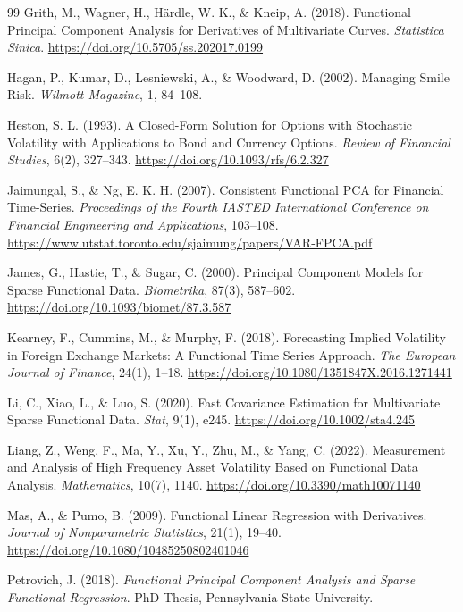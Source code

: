 \documentclass[a4paper,11pt]{article}
\begin{document}
\begin{thebibliography}{99}
Grith, M., Wagner, H., Härdle, W. K., \& Kneip, A. (2018). Functional Principal Component Analysis for Derivatives of Multivariate Curves. \emph{Statistica Sinica}. \url{https://doi.org/10.5705/ss.202017.0199}

Hagan, P., Kumar, D., Lesniewski, A., \& Woodward, D. (2002). Managing Smile Risk. \emph{Wilmott Magazine}, 1, 84--108.

Heston, S. L. (1993). A Closed-Form Solution for Options with Stochastic Volatility with Applications to Bond and Currency Options. \emph{Review of Financial Studies}, 6(2), 327--343. \url{https://doi.org/10.1093/rfs/6.2.327}

Jaimungal, S., \& Ng, E. K. H. (2007). Consistent Functional PCA for Financial Time-Series. \emph{Proceedings of the Fourth IASTED International Conference on Financial Engineering and Applications}, 103--108. \url{https://www.utstat.toronto.edu/sjaimung/papers/VAR-FPCA.pdf}

James, G., Hastie, T., \& Sugar, C. (2000). Principal Component Models for Sparse Functional Data. \emph{Biometrika}, 87(3), 587--602. \url{https://doi.org/10.1093/biomet/87.3.587}

Kearney, F., Cummins, M., \& Murphy, F. (2018). Forecasting Implied Volatility in Foreign Exchange Markets: A Functional Time Series Approach. \emph{The European Journal of Finance}, 24(1), 1--18. \url{https://doi.org/10.1080/1351847X.2016.1271441}

Li, C., Xiao, L., \& Luo, S. (2020). Fast Covariance Estimation for Multivariate Sparse Functional Data. \emph{Stat}, 9(1), e245. \url{https://doi.org/10.1002/sta4.245}

Liang, Z., Weng, F., Ma, Y., Xu, Y., Zhu, M., \& Yang, C. (2022). Measurement and Analysis of High Frequency Asset Volatility Based on Functional Data Analysis. \emph{Mathematics}, 10(7), 1140. \url{https://doi.org/10.3390/math10071140}

Mas, A., \& Pumo, B. (2009). Functional Linear Regression with Derivatives. \emph{Journal of Nonparametric Statistics}, 21(1), 19--40. \url{https://doi.org/10.1080/10485250802401046}

Petrovich, J. (2018). \emph{Functional Principal Component Analysis and Sparse Functional Regression}. PhD Thesis, Pennsylvania State University.


\end{thebibliography}
\end{document}
